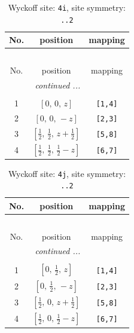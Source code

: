 \documentclass[fleqn,8pt]{jsarticle}
\begin{document}
\renewcommand{\arraystretch}{1.2}
\begin{longtable}{ccc}
\caption{Wyckoff site: {\tt 4i}, site symmetry: {\tt ..2}}
 \\
 \hline \hline
No. & position & mapping \\ \hline \endfirsthead

\multicolumn{2}{l}{\tablename\ \thetable{}} \\
 \hline \hline
No. & position & mapping \\ \hline \endhead

 \hline \hline
\multicolumn{2}{r}{\footnotesize\it continued ...} \\ \endfoot

 \hline \hline
\multicolumn{2}{r}{} \\ \endlastfoot

1 & $\left[ 0,\, 0,\, z \right]$ & {\tt [1,4]} \\ \hline
2 & $\left[ 0,\, 0,\, - z \right]$ & {\tt [2,3]} \\ \hline
3 & $\left[ \frac{1}{2},\, \frac{1}{2},\, z + \frac{1}{2} \right]$ & {\tt [5,8]} \\ \hline
4 & $\left[ \frac{1}{2},\, \frac{1}{2},\, \frac{1}{2} - z \right]$ & {\tt [6,7]} \\
\end{longtable}
\renewcommand{\arraystretch}{1.2}
\begin{longtable}{ccc}
\caption{Wyckoff site: {\tt 4j}, site symmetry: {\tt ..2}}
 \\
 \hline \hline
No. & position & mapping \\ \hline \endfirsthead

\multicolumn{2}{l}{\tablename\ \thetable{}} \\
 \hline \hline
No. & position & mapping \\ \hline \endhead

 \hline \hline
\multicolumn{2}{r}{\footnotesize\it continued ...} \\ \endfoot

 \hline \hline
\multicolumn{2}{r}{} \\ \endlastfoot

1 & $\left[ 0,\, \frac{1}{2},\, z \right]$ & {\tt [1,4]} \\ \hline
2 & $\left[ 0,\, \frac{1}{2},\, - z \right]$ & {\tt [2,3]} \\ \hline
3 & $\left[ \frac{1}{2},\, 0,\, z + \frac{1}{2} \right]$ & {\tt [5,8]} \\ \hline
4 & $\left[ \frac{1}{2},\, 0,\, \frac{1}{2} - z \right]$ & {\tt [6,7]} \\
\end{longtable}
\end{document}
